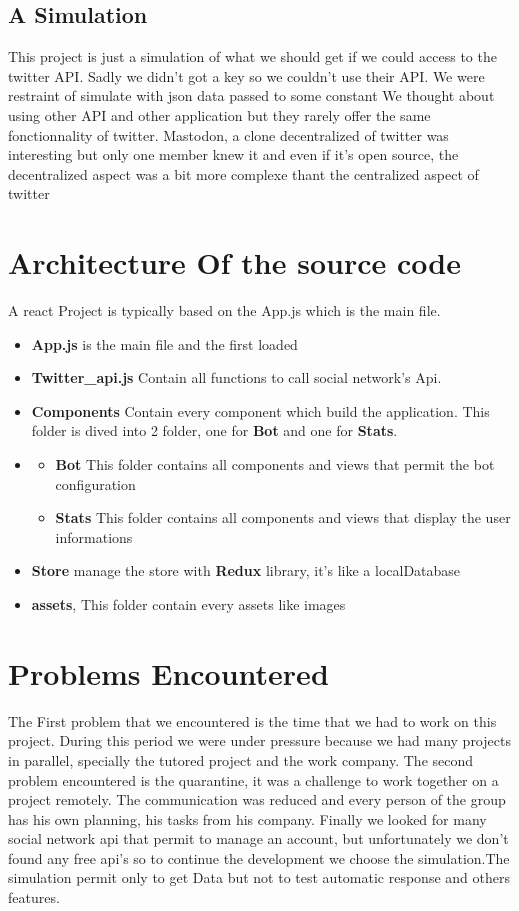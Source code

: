 \documentclass{article}
\begin{document}
\subsection{A Simulation}
This project is just a simulation of what we should get if we could access to the twitter API.
Sadly we didn't got a key so we couldn't use their API. We were restraint of simulate with json data
passed to some constant
We thought about using other API and other application but they rarely offer the same fonctionnality of twitter.
Mastodon, a clone decentralized of twitter was interesting but only one member knew it and even if it's open source, the decentralized aspect was a bit more complexe thant the centralized aspect of twitter

\section{Architecture Of the source code}
A react Project is typically based on the App.js which is the main file. 
\begin{itemize}
\item 	\textbf{App.js} is the main file and the first loaded
\item     \textbf{Twitter\_api.js} Contain all functions to call social network's Api.
\item 	\textbf{Components} Contain every component which build the application. This folder is dived      		into 2 folder, one for \textbf{Bot} and one for \textbf{Stats}. 
\item \begin{itemize}
    \item \textbf{Bot} This folder contains all components and views that permit the bot configuration
    \item \textbf{Stats} This folder contains all components and views that display the user informations
\end{itemize}

\item 	\textbf{Store} manage the store with \textbf{Redux} library, it's like a localDatabase
\item 	\textbf{assets}, This folder contain every assets like images
\end{itemize}

\section{Problems Encountered}
The First problem that we encountered is the time that we had to work on this project. During this period we were under pressure because we had many projects in parallel, specially the tutored project and the work company. The second problem encountered is the quarantine, it was a challenge to work together on a project remotely. The communication was reduced and every person of the group has his own planning, his tasks from his company. Finally we looked for many social network api that permit to manage an account, but unfortunately we don't found any free api's so to continue the development we choose the simulation.The simulation permit only to get Data but not to test automatic response and others features.
\end{document}
